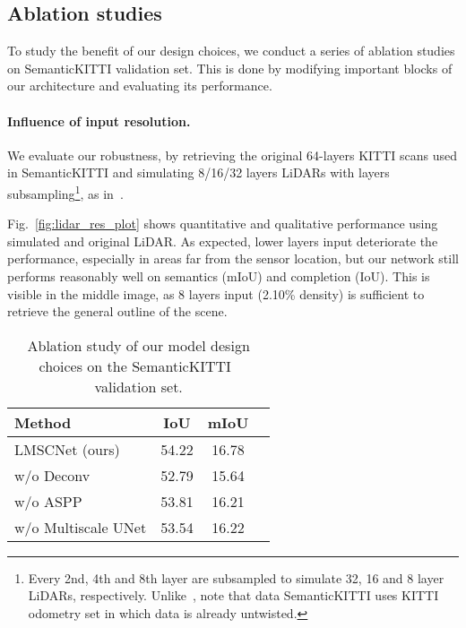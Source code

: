 \subsection{Ablation studies}
\label{sec:exp-ablation}

To study the benefit of our design choices, we conduct a series of ablation studies on SemanticKITTI validation set. This is done by modifying important blocks of our architecture and evaluating its performance. 

\paragraph{Influence of input resolution.}
We evaluate our robustness, by retrieving the original 64-layers KITTI scans used in SemanticKITTI and simulating 8/16/32 layers LiDARs with layers subsampling\footnote{Every 2nd, 4th and 8th layer are subsampled to simulate 32, 16 and 8 layer LiDARs, respectively. Unlike~\cite{Jaritz2018SparseAD}, note that data SemanticKITTI uses KITTI odometry set in which data is already untwisted.}, as in~\cite{Jaritz2018SparseAD}.


Fig.~\ref{fig:lidar_res_plot} shows quantitative and qualitative performance using simulated and original LiDAR. As expected, lower layers input deteriorate the performance, especially in areas far from the sensor location, but our network still performs reasonably well on semantics (mIoU) and completion (IoU). This is visible in the middle image, as 8 layers input (2.10\% density) is sufficient to retrieve the general outline of the scene.








\begin{table}
\centering
	\setlength{\tabcolsep}{0.01\linewidth}
		\centering
		\footnotesize
		\begin{tabular}{lccc}
			\toprule
			Method & IoU & mIoU  \\
			\midrule
			LMSCNet (ours) & 54.22 & 16.78 \\
			w/o Deconv & 52.79 &	15.64 \\
			w/o ASPP & 53.81 &	16.21 \\
			w/o Multiscale UNet & 53.54 &	16.22 \\
			\bottomrule
	\end{tabular}
\caption{Ablation study of our model design choices on the SemanticKITTI~\cite{Behley2019SemanticKITTIAD} validation set. } 
\label{table:ablation_table}
\end{table}

